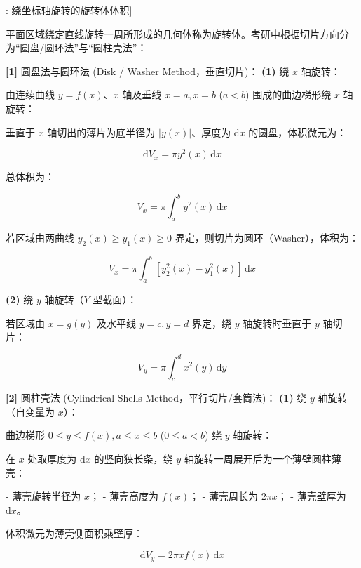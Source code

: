\documentclass[11pt,a4paper,UTF8]{ctexart}
\begin{document}
\begin{thmbox}[公式[4]: 绕坐标轴旋转的旋转体体积]

平面区域绕定直线旋转一周所形成的几何体称为旋转体。考研中根据切片方向分为“圆盘/圆环法”与“圆柱壳法”：

\textbf{[1]} 圆盘法与圆环法 (Disk / Washer Method，垂直切片)：
\textbf{(1)}  \textit{}绕 $x$ 轴旋转\textit{}：

由连续曲线 $y = f(x)$、$x$ 轴及垂线 $x = a, x = b$ ($a < b$) 围成的曲边梯形绕 $x$ 轴旋转：

垂直于 $x$ 轴切出的薄片为底半径为 $|y(x)|$、厚度为 $\mathrm{d}x$ 的圆盘，体积微元为：


\begin{equation*}
\mathrm{d}V_x = \pi y^2(x)\,\mathrm{d}x
\end{equation*}


总体积为：


\begin{equation*}
V_x = \pi \int_a^b y^2(x)\,\mathrm{d}x
\end{equation*}


若区域由两曲线 $y_2(x) \geqslant y_1(x) \geqslant 0$ 界定，则切片为圆环（Washer），体积为：


\begin{equation*}
V_x = \pi \int_a^b [y_2^2(x) - y_1^2(x)]\,\mathrm{d}x
\end{equation*}


\textbf{(2)}  \textit{}绕 $y$ 轴旋转（$Y$ 型截面）\textit{}：

若区域由 $x = g(y)$ 及水平线 $y = c, y = d$ 界定，绕 $y$ 轴旋转时垂直于 $y$ 轴切片：


\begin{equation*}
V_y = \pi \int_c^d x^2(y)\,\mathrm{d}y
\end{equation*}


\textbf{[2]} 圆柱壳法 (Cylindrical Shells Method，平行切片/套筒法)：
\textbf{(1)}  \textit{}绕 $y$ 轴旋转（自变量为 $x$）\textit{}：

曲边梯形 $0 \leqslant y \leqslant f(x), a \leqslant x \leqslant b$ ($0 \leqslant a < b$) 绕 $y$ 轴旋转：

在 $x$ 处取厚度为 $\mathrm{d}x$ 的竖向狭长条，绕 $y$ 轴旋转一周展开后为一个薄壁圆柱薄壳：

- 薄壳旋转半径为 $x$；
- 薄壳高度为 $f(x)$；
- 薄壳周长为 $2\pi x$；
- 薄壳壁厚为 $\mathrm{d}x$。

体积微元为薄壳侧面积乘壁厚：


\begin{equation*}
\mathrm{d}V_y = 2\pi x f(x)\,\mathrm{d}x
\end{equation*}



\end{thmbox}
\end{document}
